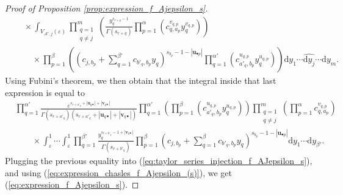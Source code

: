 \documentclass[10pt,a4paper]{amsart}
\newcommand{\dd}{\mathrm{d}}
\begin{document}
\begin{proof}[Proof of Proposition \ref{prop:expression_f_Ajepsilon_s}]
\begin{align}
    & \quad \times \int_{V_{\mathcal{A}',j}(\varepsilon)} \prod_{\substack{q=1 \\ q \neq j}}^{m} \left( \frac{y_q^{s_{r+q}-1}}{\Gamma(s_{r+q})} \prod_{p=1}^{\alpha} \left( c_{q,a_p}^{v_{q,p}} y_{q}^{v_{q,p}} \right) \right) \nonumber \\
    & \qquad \times \prod_{p=1}^{\beta} \left( \left( c_{j,b_p}+\sum_{q=1}^{\beta'} c_{b'_q,b_p} y_{q} \right)^{s_{b_p}-1-|\mathbf{u}_{\bullet p}|} \prod_{q=1}^{\alpha'} \left( c_{a'_q,b_p}^{u_{q,p}} y_{q}^{u_{q,p}} \right) \right) \dd y_1 \cdots \widehat{\dd y_{j}}\cdots \dd y_{m}. \nonumber
\end{align}
Using Fubini's theorem, we then obtain that the integral inside that last expression is equal to
\begin{align*}
    &\prod_{q=1}^{\alpha'} \frac{\varepsilon^{s_{r+a'_q}+|\mathbf{u}_{q \bullet}|+|\mathbf{v}_{q \bullet}|}}{\Gamma(s_{r+a'_q})(s_{r+a'_q} +|\mathbf{u}_{q \bullet}|+|\mathbf{v}_{q \bullet}|)} \prod_{q=1}^{\alpha'} \left(\prod_{p=1}^{\beta} \left( c_{a'_q,b_p}^{u_{q,p}} y_{q}^{u_{q,p}} \right) \right) \prod_{\substack{q=1 \\ q \neq j}}^{m} \left( \prod_{p=1}^{\alpha} c_{q,a_p}^{v_{q,p}} \right)  \\
    & \qquad \times \int_{\varepsilon}^1 \cdots \int_{\varepsilon}^1 \prod_{q=1}^{\beta'} \frac{y_q^{s_{r+b'_q}-1 + |\mathbf{v}_{q \bullet}|}}{\Gamma(s_{r+b'_q})} \prod_{p=1}^{\beta}  \left( c_{j,b_p}+\sum_{q=1}^{\beta} c_{b'_q,b_p} y_{q} \right)^{s_{b_p}-1-|\mathbf{u}_{\bullet p}|} \dd y_1 \cdots \dd y_{\beta'}.
\end{align*}
Plugging the previous equality into (\ref{eq:taylor_series_injection_f_AJepsilon_s}), and using (\ref{eq:expression_chasles_f_Ajepsilon_(s)}), we get (\ref{eq:expression_f_Ajepsilon_s}).
\end{proof}
\end{document}
